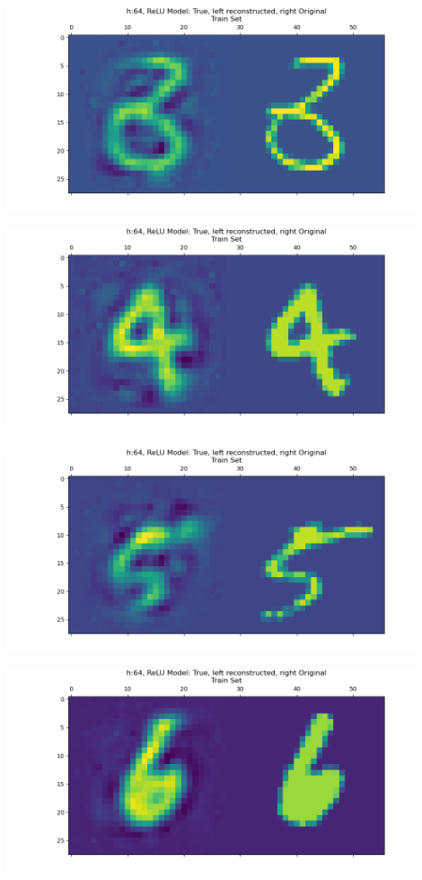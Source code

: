 \documentclass[]{article}
\begin{document}
        \begin{center}
            \includegraphics*[width=12cm]{A4plots/06-53-52-h-64-nonlin-digit-3.png}
        \end{center}
        \begin{center}
            \includegraphics*[width=12cm]{A4plots/06-53-52-h-64-nonlin-digit-4.png}
        \end{center}
        \begin{center}
            \includegraphics*[width=12cm]{A4plots/06-53-52-h-64-nonlin-digit-5.png}
        \end{center}
        \begin{center}
            \includegraphics*[width=12cm]{A4plots/06-53-52-h-64-nonlin-digit-6.png}
        \end{center}
\end{document}
